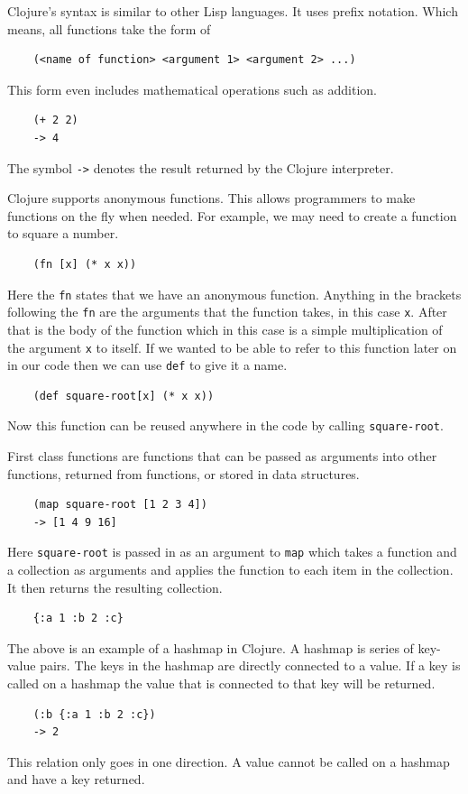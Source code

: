 \documentclass[12pt]{article}
\begin{document}
Clojure's syntax is similar to other Lisp languages. It uses prefix notation. Which means, all functions take the form of
\begin{verbatim}
	(<name of function> <argument 1> <argument 2> ...)
\end{verbatim}
This form even includes mathematical operations such as addition.
\begin{verbatim}
	(+ 2 2)
	-> 4
\end{verbatim}
The symbol \texttt{->} denotes the result returned by the Clojure interpreter.

Clojure supports anonymous functions. This allows programmers to make functions on the fly when needed. For example, we may need to create a function to square a number.
\begin{verbatim}
	(fn [x] (* x x))
\end{verbatim}
Here the \texttt{fn} states that we have an anonymous function. Anything in the brackets following the \texttt{fn} are the arguments that the function takes, in this case \texttt{x}. After that is the body of the function which in this case is a simple multiplication of the argument \texttt{x} to itself. If we wanted to be able to refer to this function later on in our code then we can use \texttt{def} to give it a name.
\begin{verbatim}
	(def square-root[x] (* x x))
\end{verbatim}
Now this function can be reused anywhere in the code by calling \texttt{square-root}.

First class functions are functions that can be passed as arguments into other functions, returned from functions, or stored in data structures.
\begin{verbatim}
	(map square-root [1 2 3 4])
	-> [1 4 9 16]
\end{verbatim}
Here \texttt{square-root} is passed in as an argument to \texttt{map} which takes a function and a collection as arguments and applies the function to each item in the collection. It then returns the resulting collection.

\begin{verbatim}
	{:a 1 :b 2 :c}
\end{verbatim}
The above is an example of a hashmap in Clojure. A hashmap is series of key-value pairs. The keys in the hashmap are directly connected to a value. If a key is called on a hashmap the value that is connected to that key will be returned.
\begin{verbatim}
	(:b {:a 1 :b 2 :c})
	-> 2
\end{verbatim}
This relation only goes in one direction. A value cannot be called on a hashmap and have a key returned. 
\end{document}
